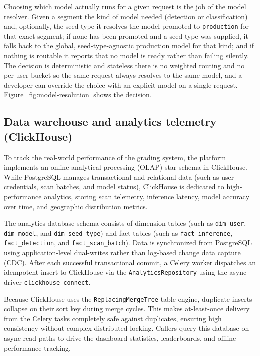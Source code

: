 Choosing which model actually runs for a given request is the job of the model
resolver. Given a segment the kind of model needed (detection or classification) and, optionally, the seed type it resolves the model promoted
to \texttt{production} for that exact segment; if none has been promoted and a
seed type was supplied, it falls back to the global, seed-type-agnostic production
model for that kind; and if nothing is routable it reports that no model is ready
rather than failing silently. The decision is deterministic and stateless there
is no weighted routing and no per-user bucket so the same request always
resolves to the same model, and a developer can override the choice with an
explicit model on a single request. Figure~\ref{fig:model-resolution} shows the
decision.


\subsection{Data warehouse and analytics telemetry (ClickHouse)}

To track the real-world performance of the grading system, the platform implements an online analytical processing (OLAP) star schema in ClickHouse. While PostgreSQL manages transactional and relational data (such as user credentials, scan batches, and model status), ClickHouse is dedicated to high-performance analytics, storing scan telemetry, inference latency, model accuracy over time, and geographic distribution metrics.

The analytics database schema consists of dimension tables (such as \texttt{dim\_user}, \texttt{dim\_model}, and \texttt{dim\_seed\_type}) and fact tables (such as \texttt{fact\_inference}, \texttt{fact\_detection}, and \texttt{fact\_scan\_batch}). Data is synchronized from PostgreSQL using application-level dual-writes rather than log-based change data capture (CDC). After each successful transactional commit, a Celery worker dispatches an idempotent insert to ClickHouse via the \texttt{AnalyticsRepository} using the async driver \texttt{clickhouse-connect}.

Because ClickHouse uses the \texttt{ReplacingMergeTree} table engine, duplicate inserts collapse on their sort key during merge cycles. This makes at-least-once delivery from the Celery tasks completely safe against duplicates, ensuring high consistency without complex distributed locking. Callers query this database on async read paths to drive the dashboard statistics, leaderboards, and offline performance tracking.

